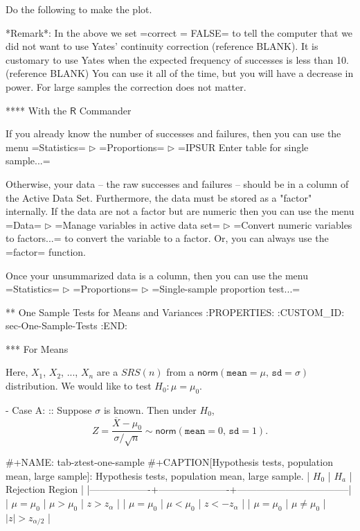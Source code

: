 Do the following to make the plot.


*Remark*: In the above we set =correct = FALSE= to tell the computer
that we did not want to use Yates' continuity correction (reference
BLANK).  It is customary to use Yates when the expected frequency of
successes is less than 10. (reference BLANK) You can use it all of the
time, but you will have a decrease in power. For large samples the
correction does not matter.

**** With the \(\mathsf{R}\) Commander

If you already know the number of successes and failures, then you can
use the menu =Statistics= \(\triangleright\) =Proportions=
\(\triangleright\) =IPSUR Enter table for single sample...=

Otherwise, your data -- the raw successes and failures -- should be in
a column of the Active Data Set. Furthermore, the data must be stored
as a "factor" internally. If the data are not a factor but are numeric
then you can use the menu =Data= \(\triangleright\) =Manage variables
in active data set= \(\triangleright\) =Convert numeric variables to
factors...= to convert the variable to a factor. Or, you can always
use the =factor= function.

Once your unsummarized data is a column, then you can use the menu
=Statistics= \(\triangleright\) =Proportions= \(\triangleright\)
=Single-sample proportion test...=

** One Sample Tests for Means and Variances
:PROPERTIES:
:CUSTOM_ID: sec-One-Sample-Tests
:END:

*** For Means

Here, \(X_{1}\), \(X_{2}\), ..., \(X_{n}\) are a \(SRS(n)\) from a
\(\mathsf{norm}(\mathtt{mean} = \mu,\,\mathtt{sd} = \sigma)\)
distribution. We would like to test \(H_{0}:\mu = \mu_{0}\).

- Case A: :: Suppose \(\sigma\) is known. Then under \(H_{0}\),
   \[
   Z = \frac{\overline{X} - \mu_{0}}{\sigma/\sqrt{n}} \sim \mathsf{norm}(\mathtt{mean} = 0,\,\mathtt{sd} = 1).
   \]
   
   #+NAME: tab-ztest-one-sample
   #+CAPTION[Hypothesis tests, population mean, large sample]: Hypothesis tests, population mean, large sample.
   | \(H_{0}\)         | \(H_{a}\)            | Rejection Region                  |
   |-------------------+----------------------+-----------------------------------|
   | \(\mu = \mu_{0}\) | \(\mu > \mu_{0}\)    | \(z > z_{\alpha}\)                |
   | \(\mu = \mu_{0}\) | \(\mu < \mu_{0}\)    | \(z < -z_{\alpha}\)               |
   | \(\mu = \mu_{0}\) | \(\mu \neq \mu_{0}\) | \( \vert z \vert > z_{\alpha/2}\) |

